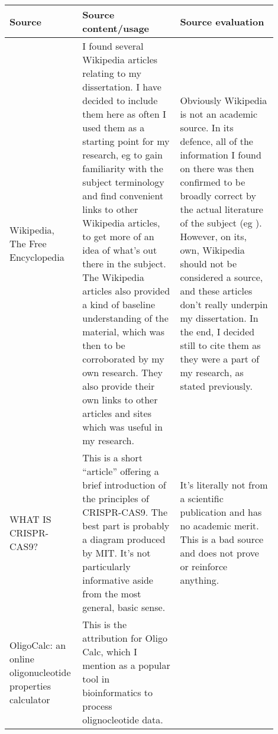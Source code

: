 \documentclass[a4paper,11pt]{article}
\begin{document}
    \begin{center}
    {
    \renewcommand{\arraystretch}{2.0}
    \begin{longtable}{p{0.2\linewidth} p{0.35\linewidth} p{0.35\linewidth}} \toprule
    Source & Source content/usage & Source evaluation \\ \midrule

    Wikipedia, The Free Encyclopedia
    \cite{WikiCRISPR,WikiCas9,WikiHadamardCode,WikiHadamardMatrix,WikiHammingCode,
          WikiHamming74,WikiBarcoding} &

    I found several Wikipedia articles relating to my dissertation. I have
    decided to include them here as often I used them as a starting point for my
    research, eg to gain familiarity with the subject terminology and find
    convenient links to other Wikipedia articles, to get more of an idea of
    what's out there in the subject. The Wikipedia articles also provided a kind
    of baseline understanding of the material, which was then to be corroborated
    by my own research. They also provide their own links to other articles and
    sites which was useful in my research. &

    Obviously Wikipedia is not an academic source. In its defence, all of the
    information I found on there was then confirmed to be broadly correct by
    the actual literature of the subject (eg
    \cite{Codes1950Hamming,Communication1948Shannon}). However, on its, own,
    Wikipedia should not be considered a source, and these articles don't really
    underpin my dissertation. In the end, I decided still to cite them as they
    were a part of my research, as stated previously. \\

    WHAT IS CRISPR-CAS9? \cite{CRISPRDailymail} &

    This is a short ``article'' offering a brief introduction of the principles
    of CRISPR-CAS9. The best part is probably a diagram produced by MIT. It's
    not particularly informative aside from the most general, basic sense. &

    It's literally not from a scientific publication and has no academic merit.
    This is a bad source and does not prove or reinforce anything.

    \\

    OligoCalc: an online oligonucleotide properties calculator \cite{oligotm} &

    This is the attribution for Oligo Calc, which I mention as a popular tool in
    bioinformatics to process olignocleotide data. &


\end{longtable}}
\end{center}
\end{document}
